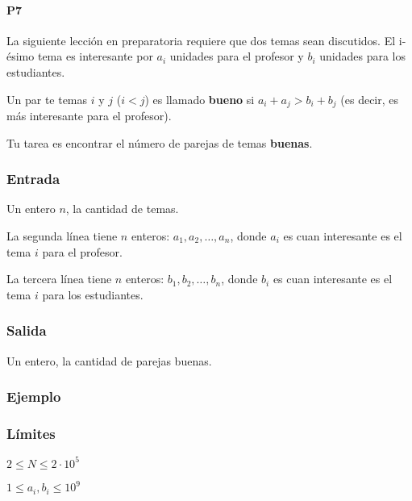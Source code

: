 \problembreak
 
 \paragraph{P7} La siguiente lección en preparatoria requiere que dos temas sean discutidos. El i-ésimo tema es interesante por \(a_i\) unidades para el profesor y \(b_i\) unidades para los estudiantes.
 
 Un par te temas \(i\) y \(j\) (\(i<j\)) es llamado \textbf{bueno} si \(a_i+a_j > b_i+b_j\) (es decir, es más interesante para el profesor).
 
 Tu tarea es encontrar el número de parejas de temas \textbf{buenas}.
 \subsubsection*{Entrada}
 Un entero \(n\), la cantidad de temas.
 
 La segunda línea tiene \(n\) enteros: \(a_1,a_2,\ldots, a_n\), donde \(a_i\) es cuan interesante es el tema \(i\) para el profesor.
 
 La tercera línea tiene \(n\) enteros: \(b_1,b_2,\ldots, b_n\), donde \(b_i\) es cuan interesante es el tema \(i\) para los estudiantes.
 
 \subsubsection*{Salida}
 Un entero, la cantidad de parejas buenas.
 
 \subsubsection*{Ejemplo}
 \begin{casebox2}
 \end{casebox2}

\subsubsection*{Límites}
\begin{plimits}
	\item \(2\leq N\leq 2\cdot 10^5\)
	\item \(1\leq a_i, b_i\leq  10^9\)
\end{plimits}
 \codeforces
 
